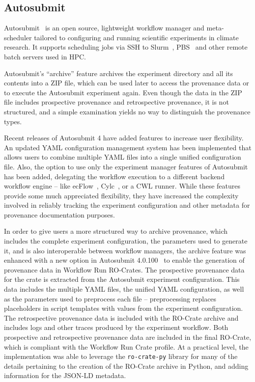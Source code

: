 \subsection{Autosubmit}\label{wrroc:autosubmit}

Autosubmit~\cite{Manubens-Gil 2016} is an open source, lightweight workflow manager and meta-scheduler tailored to configuring and running scientific experiments in climate research. It supports scheduling jobs via SSH to Slurm~\cite{Yoo 2003}, PBS~\cite{Feng 2007} and other remote batch servers used in HPC.

Autosubmit's ``archive'' feature archives the experiment directory and all its contents into a ZIP file, which can be used later to access the provenance data or to execute the Autosubmit experiment again.
Even though the data in the ZIP file includes prospective provenance and retrospective provenance, it is not structured, and a simple examination yields no way to distinguish the provenance types.

Recent releases of Autosubmit 4 have added features to increase user flexibility.  An updated YAML configuration management system has been implemented that allows users to combine multiple YAML files into a single unified configuration file.
Also, the option to use only the experiment manager features of Autosubmit has been added, delegating the workflow execution to a different backend workflow engine -- like ecFlow~\cite{Bahra 2011}, Cylc~\cite{Oliver 2019}, or a CWL runner.
While these features provide some much appreciated flexibility, they have increased the complexity involved in reliably tracking the experiment configuration and other metadata for provenance documentation purposes.

In order to give users a more structured way to archive provenance, which includes the complete experiment configuration, the parameters used to generate it, and is also interoperable between workflow managers, the archive feature was enhanced with a new option in Autosubmit 4.0.100~\cite{Beltran 2023} to enable the generation of provenance data in Workflow Run RO-Crates.
%
The prospective provenance data for the crate is extracted from the Autosubmit experiment configuration.
This data includes the multiple YAML files, the unified YAML configuration, as well as the parameters used to preprocess each file -- preprocessing replaces placeholders in script templates with values from the experiment configuration.
The retrospective provenance data is included with the RO-Crate archive and includes logs and other traces produced by the experiment workflow.
Both prospective and retrospective provenance data are included in the final RO-Crate, which is compliant with the Workflow Run Crate profile.
%
At a practical level, the implementation was able to leverage the \texttt{ro-crate-py} library for many of the details pertaining to the creation of the RO-Crate archive in Python, and adding information for the JSON-LD metadata.

